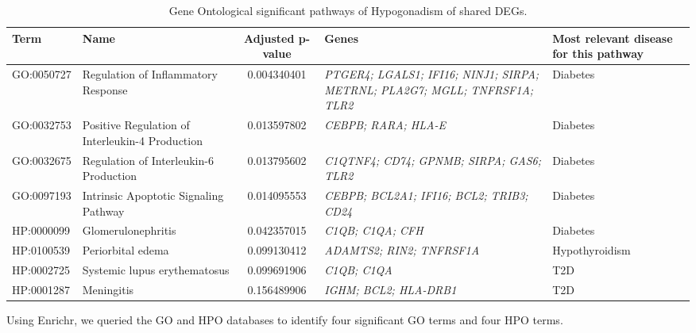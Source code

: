 \begin{table}[H]
\centering
\caption{Gene Ontological significant pathways of Hypogonadism of shared DEGs.}
\renewcommand{\arraystretch}{1.0} %
\small
\begin{tabularx}{\textwidth}{|l|X|c|X|X|}
\hline
\textbf{Term} & \textbf{Name} & \textbf{Adjusted p-value} & \textbf{Genes} & \textbf{Most relevant disease for this pathway} \\
\hline
GO:0050727 & Regulation of Inflammatory Response & 0.004340401 & \textit{PTGER4; LGALS1; IFI16; NINJ1; SIRPA; METRNL; PLA2G7; MGLL; TNFRSF1A; TLR2} & Diabetes \\
\hline
GO:0032753 & Positive Regulation of Interleukin-4 Production & 0.013597802 & \textit{CEBPB; RARA; HLA-E} & Diabetes \\
\hline
GO:0032675 & Regulation of Interleukin-6 Production & 0.013795602 & \textit{C1QTNF4; CD74; GPNMB; SIRPA; GAS6; TLR2} & Diabetes \\
\hline
GO:0097193 & Intrinsic Apoptotic Signaling Pathway & 0.014095553 & \textit{CEBPB; BCL2A1; IFI16; BCL2; TRIB3; CD24} & Diabetes \\
\hline
HP:0000099 & Glomerulonephritis & 0.042357015 & \textit{C1QB; C1QA; CFH} & Diabetes \\
\hline
HP:0100539 & Periorbital edema & 0.099130412 & \textit{ADAMTS2; RIN2; TNFRSF1A} & Hypothyroidism \\
\hline
HP:0002725 & Systemic lupus erythematosus & 0.099691906 & \textit{C1QB; C1QA} & T2D \\
\hline
HP:0001287 & Meningitis & 0.156489906 & \textit{IGHM; BCL2; HLA-DRB1} & T2D \\
\hline
\end{tabularx}
\end{table}


Using Enrichr, we queried the GO and HPO databases to identify four significant GO terms and four HPO terms.

